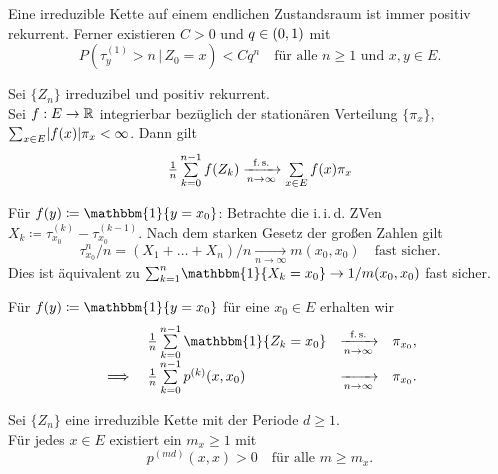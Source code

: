 \documentclass{cheat-sheet}
\newcommand{\ind}{\mathbbm{1}} %
\newcommand{\iid}{i.\,i.\,d.} %
\newcommand{\Defn}[1]{\textcolor{DefinitionColor}{#1}}
\begin{document}

\begin{satz}
  Eine irreduzible Kette auf einem endlichen Zustandsraum ist immer positiv rekurrent.
  Ferner existieren $C > 0$ und $q \in \left( 0, 1 \right)$ mit
  \[
    P(\tau_y^{(1)} > n \,|\, Z_0 = x) < C q^n
    \quad \text{für alle $n \geq 1$ und $x, y \in E$.}
  \]
\end{satz}

\begin{satz}
  Sei $\{ Z_n \}$ irreduzibel und positiv rekurrent. \\
  Sei $f : E \to \mathbb{R}$ integrierbar bezüglich der stationären Verteilung $\{ \pi_x \}$, \dh{} ${\sum}_{x \in E} \abs{f(x)} \pi_x < \infty$.
  Dann gilt
  \[
    \tfrac{1}{n} \sum_{k=0}^{n-1} f(Z_k) \xrightarrow[n \to \infty]{\text{f.\,s.}} \sum_{x \in E} f(x) \pi_x
  \]
\end{satz}

\begin{beweisskizze}
  Für $f(y) \coloneqq \ind \{ y = x_0 \}$:
  Betrachte die \iid{} ZVen $X_k \coloneqq \tau_{x_0}^{(k)} - \tau_{x_0}^{(k-1)}$.
  Nach dem starken Gesetz der großen Zahlen gilt
  \[
    \tau_{x_0}^n / n = (X_1 + \ldots + X_n) / n \xrightarrow[n \to \infty]{} m(x_0, x_0)
    \quad \text{fast sicher.}
  \]
  Dies ist äquivalent zu ${\sum}_{k=1}^{n} \ind \{ X_k = x_0 \} \to 1 / m(x_0, x_0)$ fast sicher.
\end{beweisskizze}

\begin{bsp}
  Für $f(y) \coloneqq \ind \{ y = x_0 \}$ für eine $x_0 \in E$ erhalten wir
  \[
    \begin{array}{r l c l}
      & \tfrac{1}{n} \sum_{k=0}^{n-1} \ind \{ Z_k = x_0 \} &\xrightarrow[n \to \infty]{\text{f.\,s.}}& \pi_{x_0}, \\
      \implies & \tfrac{1}{n} \sum_{k=0}^{n-1} p^{(k)}(x, x_0) &\xrightarrow[n \to \infty]{}& \pi_{x_0}.
    \end{array}
  \]
\end{bsp}


\begin{lem}
  Sei $\{ Z_n \}$ eine irreduzible Kette mit der Periode $d \geq 1$. \\
  Für jedes $x \in E$ existiert ein $m_x \geq 1$ mit
  \[
    p^{(md)}(x, x) > 0 \quad
    \text{für alle $m \geq m_x$.}
  \]
\end{lem}
\end{document}
